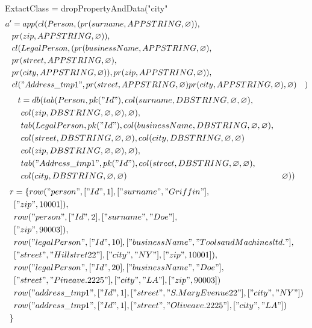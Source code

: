 \documentclass[11pt]{article}
\begin{document}
\newpage
ExtactClass = dropPropertyAndData("city"
\begin{align*}
a' &= app(cl(Person, (pr(surname, APPSTRING, \varnothing)), \\
& pr(zip, APPSTRING, \varnothing)), \\
& cl(LegalPerson, (pr(businessName, APPSTRING, \varnothing), \\
& pr(street, APPSTRING, \varnothing), \\
& pr(city, APPSTRING, \varnothing)), pr(zip, APPSTRING, \varnothing)), \\
& cl("Address\_tmp1", pr(street, APPSTRING, \varnothing) pr(city, APPSTRING, \varnothing) , \varnothing)
& )
\end{align*}
\begin{align*}
t &= db(tab(Person, pk("Id"), col(surname, DBSTRING, \varnothing, \varnothing), \\
& col(zip, DBSTRING, \varnothing, \varnothing), \varnothing), \\
& tab(LegalPerson, pk("Id"),  col(businessName, DBSTRING, \varnothing, \varnothing), \\
& col(street, DBSTRING, \varnothing, \varnothing), col(city, DBSTRING, \varnothing, \varnothing) \\
& col(zip, DBSTRING, \varnothing, \varnothing), \varnothing), \\
& tab("Address\_tmp1", pk("Id"), col(street, DBSTRING, \varnothing, \varnothing),\\
& col(city, DBSTRING, \varnothing, \varnothing)
& \varnothing)) 
\end{align*}
\begin{align*}
r &= \{ row("person", ["Id", 1], ["surname", "Griffin"], \\
& ["zip", 10001]), \\
& row("person", ["Id", 2], ["surname", "Doe"], \\
& ["zip", 90003]), \\
& row("legalPerson", ["Id", 10], ["businessName", "Tools and Machines ltd."], \\
& ["street", "Hill stret 22"], ["city", "NY"], ["zip", 10001]), \\
& row("legalPerson", ["Id", 20], ["businessName", "Doe"], \\
& ["street", "Pine ave. 2225"], ["city", "LA"], ["zip", 90003])\\
& row("address\_tmp1", ["Id", 1], ["street", "S. Mary Evenue 22"], ["city", "NY"]) \\
& row("address\_tmp1", ["Id", 1], ["street", "Olive ave. 2225"], ["city", "LA"] )\\
\}
\end{align*}
\end{document}
